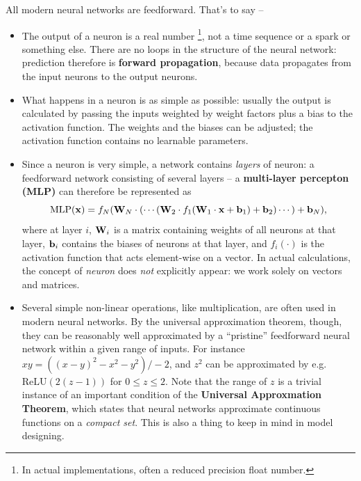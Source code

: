 \documentclass[hyperref, a4paper, 12pt]{report}
\newcommand*{\concept}[1]{{\textbf{#1}}}
\begin{document}
All modern neural networks are feedforward. That's to say -- 
\begin{itemize}
    \item The output of a neuron is a real number%
    \footnote{
        In actual implementations, often a reduced precision float number.
    }, not a time sequence or a spark or something else.
    There are no loops in the structure of the neural network:
    prediction therefore is \concept{forward propagation},
    because data propagates from the input neurons to the output neurons.
    
    \item What happens in a neuron is as simple as possible:
    usually the output is calculated by 
    passing the inputs weighted by weight factors plus a bias
    to the activation function.
    The weights and the biases can be adjusted;
    the activation function contains no learnable parameters.

    \item Since a neuron is very simple, a network contains \emph{layers} of neuron:
    a feedforward network consisting of several layers -- a \concept{multi-layer percepton (MLP)} can therefore be represented as 
    \begin{equation}
        \mathrm{MLP}(\vb{x}) = f_N(\vb{W}_N \cdot (\cdots (\vb{W}_2 \cdot f_1(\vb{W}_1 \cdot \vb{x} + \vb{b}_1) + \vb{b}_2) \cdots) + \vb{b}_N),
        \label{eq:mlp}
    \end{equation}
    where at layer $i$, $\vb{W}_i$ is a matrix containing weights of all neurons at that layer, $\vb{b}_i$ contains the biases of neurons at that layer, and $f_i (\cdot)$ is the activation function that acts element-wise on a vector.
    In actual calculations, the concept of \emph{neuron} does \emph{not} explicitly appear:
    we work solely on vectors and matrices.

    \item Several simple non-linear operations, like multiplication,
    are often used in modern neural networks.
    By the universal approximation theorem, though, they can be reasonably well approximated by a ``pristine'' feedforward neural network within a given range of inputs.
    For instance $xy = ((x-y)^2 - x^2 - y^2) / -2$,
    and $z^2$ can be approximated by e.g. $\mathrm{ReLU}(2(z-1))$ for $0 \leq z \leq 2$.
    Note that the range of $z$ is a trivial instance of an important condition of the \concept{Universal Approxmation Theorem}, which states that neural networks approximate continuous functions on a \emph{compact set}.
    This is also a thing to keep in mind in model designing.
    

\end{itemize}
\end{document}
